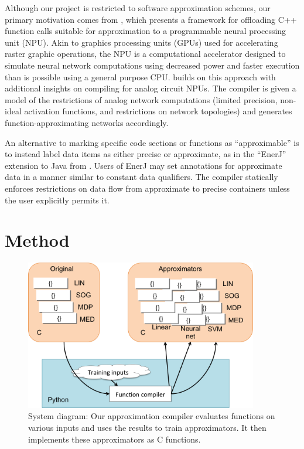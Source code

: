 \documentclass{article}
\begin{document}
Although our project is restricted to software approximation schemes, our primary motivation comes from \cite{Esmaeilzadeh12}, which presents a framework for offloading C++ function calls suitable for approximation to a programmable neural processing unit (NPU). Akin to graphics processing units (GPUs) used for accelerating raster graphic operations, the NPU is a computational accelerator designed to simulate neural network computations using decreased power and faster execution than is possible using a general purpose CPU. \cite{Amant14} builds on this approach with additional insights on compiling for analog circuit NPUs. The compiler is given a model of the restrictions of analog network computations (limited precision, non-ideal activation functions, and restrictions on network topologies) and generates function-approximating networks accordingly.

An alternative to marking specific code sections or functions as ``approximable'' is to instead label data items as either precise or approximate, as in the ``EnerJ'' extension to Java from \cite{Sampson11}. Users of EnerJ may set annotations for approximate data in a manner similar to constant data qualifiers. The compiler statically enforces restrictions on data flow from approximate to precise containers unless the user explicitly permits it.

\section{Method}

\begin{figure}
  \centering
  \includegraphics[width=4in]{images/diagram.png}
  \caption{System diagram: Our approximation compiler evaluates functions on various inputs and uses the results to train approximators. It then implements these approximators as C functions.}
\end{figure}
\end{document}
